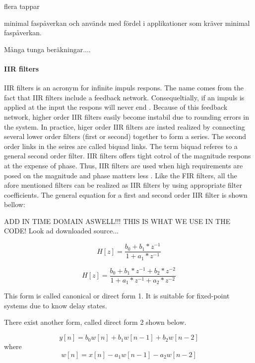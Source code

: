 \documentclass[12p]{article}
\begin{document}
flera tappar

minimal faspåverkan och används med fördel i applikationer som kräver minimal faspåverkan.

Många tunga beräkningar....


\paragraph{IIR filters}
IIR filters is an acronym for infinite impuls respons. The name comes from the fact that IIR filters include a feedback network. Consequeltially, if an impuls is applied at the input the respons will never end \cite{sven}. Because of this feedback network, higher order IIR filters easily become instabil due to rounding errors in the system. In practice, higer order IIR filters are insted realized by connecting several lower order filters (first or second) together to form a series. The second order links in the seires are called biquad links. The term biquad referes to a general second order filter. IIR filters offers tight cotrol of the magnitude respons at the expense of phase. Thus, IIR filters are used when high requirements are posed on the magnitude and phase matters less \cite{storn}. Like the FIR filters, all the afore mentioned filters can be realized as IIR filters by using appropriate filter coefficients. The general equation for a first and second order IIR filter is shown bellow: \\
\null

ADD IN TIME DOMAIN ASWELL!!! THIS IS WHAT WE USE IN THE CODE! Look ad downloaded source...

\begin{equation}
H[z] = \frac{b_0 + b_1*z^{-1}}{1+a_1*z^{-1}}
\end{equation}

\begin{equation}
H[z] = \frac{b_0 + b_1*z^{-1}+b_2*z^{-2}}{1+a_1*z^{-1}+a_2*z^{-2}}
\end{equation}

This form is called canonical or direct form 1. It is suitable for fixed-point systems due to know delay states.

There exist another form, called direct form 2 shown below.

\begin{equation}
 y[n]=b_{0}w[n]+b_{1}w[n-1]+b_{2}w[n-2]
\end{equation}
where
\begin{equation}
 w[n]=x[n]-a_{1}w[n-1]-a_{2}w[n-2]
\end{equation}  
\end{document}

